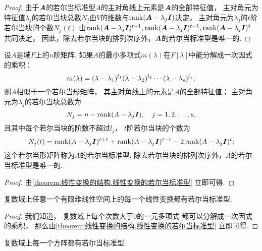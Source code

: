 \begin{theorem}
\begin{proof}
由于\(\boldsymbol{A}\)的若尔当标准型\(A\)的主对角线上元素是\(\boldsymbol{A}\)的全部特征值，
主对角元为特征值\(\lambda_j\)的若尔当块总数\(N_j\)由\(V\)的维数与\(\rank\EpAj\)决定，
主对角元为\(\lambda_j\)的\(t\)阶若尔当块的个数\(N_j(t)\)
由\(\rank\EpAj[t+1],\rank\EpAj[t-1],\rank\EpAj[t]\)共同决定，
因此，除去若尔当块的排列次序外，\(\boldsymbol{A}\)的若尔当标准型是唯一的.
\end{proof}
\end{theorem}

\begin{corollary}
设\(A\)是域\(F\)上的\(n\)阶矩阵.
如果\(A\)的最小多项式\(m(\lambda)\)在\(F[\lambda]\)中能分解成一次因式的乘积：\begin{equation*}
	m(\lambda) = \LambdaExpL{1} \LambdaExpL{2} \dotsm \LambdaExpL{s},
\end{equation*}
则\(A\)相似于一个若尔当形矩阵，
其主对角线上的元素是\(A\)的全部特征值；
主对角元为\(\lambda_j\)的若尔当块总数为\begin{equation*}
	N_j = n - \rank\EigenPoly{A}{j},
	\quad j=1,2,\dotsc,s,
\end{equation*}
且其中每个若尔当块的阶数不超过\(l_j\)，
\(t\)阶若尔当块的个数为\begin{equation*}
	N_j(t) = \rank\EigenPoly{A}{j}[t+1]
		+ \rank\EigenPoly{A}{j}[t-1]
		- 2\rank\EigenPoly{A}{j}[t];
\end{equation*}
\rm
这个若尔当形矩阵称为\(A\)的若尔当标准型.
除去若尔当块的排列次序外，\(A\)的若尔当标准型是唯一的.
\begin{proof}
由\cref{theorem:线性变换的结构.线性变换的若尔当标准型} 立即可得.
\end{proof}
\end{corollary}

\begin{proposition}
复数域上任意一个有限维线性空间上的每一个线性变换都有若尔当标准型.
\begin{proof}
我们知道，
复数域上每个次数大于0的一元多项式
都可以分解成一次因式的乘积，
那么由\cref{theorem:线性变换的结构.线性变换的若尔当标准型} 立即可得.
\end{proof}
\end{proposition}

\begin{proposition}
复数域上每一个方阵都有若尔当标准型.
\end{proposition}

